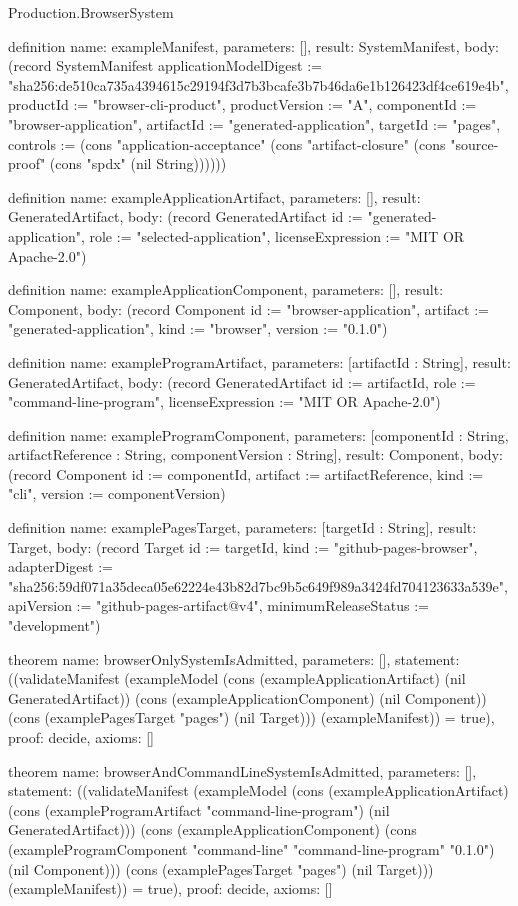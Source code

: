 \begin{lexlean}{Production.BrowserSystem}
\begin{semanticmodule}
definition{
  name: exampleManifest,
  parameters: [],
  result: SystemManifest,
  body: (record SystemManifest {applicationModelDigest := "sha256:de510ca735a4394615c29194f3d7b3bcafe3b7b46da6e1b126423df4ce619e4b", productId := "browser-cli-product", productVersion := "A", componentId := "browser-application", artifactId := "generated-application", targetId := "pages", controls := (cons "application-acceptance" (cons "artifact-closure" (cons "source-proof" (cons "spdx" (nil String)))))})
}

definition{
  name: exampleApplicationArtifact,
  parameters: [],
  result: GeneratedArtifact,
  body: (record GeneratedArtifact {id := "generated-application", role := "selected-application", licenseExpression := "MIT OR Apache-2.0"})
}

definition{
  name: exampleApplicationComponent,
  parameters: [],
  result: Component,
  body: (record Component {id := "browser-application", artifact := "generated-application", kind := "browser", version := "0.1.0"})
}

definition{
  name: exampleProgramArtifact,
  parameters: [artifactId : String],
  result: GeneratedArtifact,
  body: (record GeneratedArtifact {id := artifactId, role := "command-line-program", licenseExpression := "MIT OR Apache-2.0"})
}

definition{
  name: exampleProgramComponent,
  parameters: [componentId : String, artifactReference : String, componentVersion : String],
  result: Component,
  body: (record Component {id := componentId, artifact := artifactReference, kind := "cli", version := componentVersion})
}

definition{
  name: examplePagesTarget,
  parameters: [targetId : String],
  result: Target,
  body: (record Target {id := targetId, kind := "github-pages-browser", adapterDigest := "sha256:59df071a35deca05e62224e43b82d7bc9b5c649f989a3424fd704123633a539e", apiVersion := "github-pages-artifact@v4", minimumReleaseStatus := "development"})
}

theorem{
  name: browserOnlySystemIsAdmitted,
  parameters: [],
  statement: ((validateManifest (exampleModel (cons (exampleApplicationArtifact) (nil GeneratedArtifact)) (cons (exampleApplicationComponent) (nil Component)) (cons (examplePagesTarget "pages") (nil Target))) (exampleManifest)) = true),
  proof: decide{},
  axioms: []
}

theorem{
  name: browserAndCommandLineSystemIsAdmitted,
  parameters: [],
  statement: ((validateManifest (exampleModel (cons (exampleApplicationArtifact) (cons (exampleProgramArtifact "command-line-program") (nil GeneratedArtifact))) (cons (exampleApplicationComponent) (cons (exampleProgramComponent "command-line" "command-line-program" "0.1.0") (nil Component))) (cons (examplePagesTarget "pages") (nil Target))) (exampleManifest)) = true),
  proof: decide{},
  axioms: []
}


\end{semanticmodule}
\end{lexlean}

